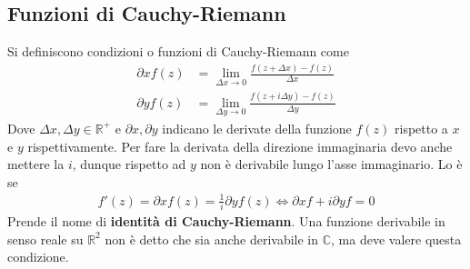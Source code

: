 \documentclass[a4paper, oneside]{article}
\begin{document}
\subsection{Funzioni di Cauchy-Riemann}
Si definiscono condizioni o funzioni di Cauchy-Riemann come 
\begin{align}
    \partial x f(z) &= \lim_{\Delta x \to 0} \frac{f(z + \Delta x) - f(z)}{\Delta x} \\
    \partial y f(z) &= \lim_{\Delta y \to 0} \frac{f(z + i\Delta y) - f(z)}{\Delta y} 
\end{align}
Dove $\Delta x, \Delta y \in \mathbb{R}^{+}$ e $\partial x, \partial y$ indicano le derivate della 
funzione $f(z)$ rispetto a $x$ e $y$ rispettivamente. Per fare la derivata della direzione immaginaria devo 
anche mettere la $i$, dunque rispetto ad $y$ non è derivabile lungo l'asse
immaginario. Lo è se 
\begin{gather*}
    f'(z) = \boxed{\partial x f(z) = \frac{1}{i} \partial y f(z)} \Longleftrightarrow \partial x f + i\partial y f = 0
\end{gather*}
Prende il nome di \textbf{identità di Cauchy-Riemann}. Una funzione derivabile in senso 
reale su $\mathbb{R}^{2}$ non è detto che sia anche derivabile in $\mathbb{C}$, ma deve valere questa condizione. 
\end{document}
